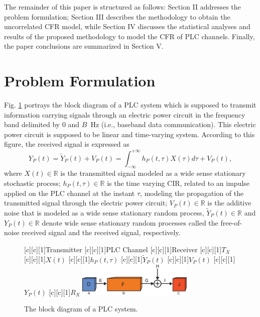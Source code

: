\documentclass[journal]{IEEEtran}
\begin{document}
The remainder of this paper is structured as follows: Section II addresses
the problem formulation; Section III describes the methodology to obtain the uncorrelated \ac{CFR} model, while Section IV discusses the statistical analyses and results of the proposed methodology to model the \ac{CFR} of \ac{PLC} channels. Finally, the paper conclusions are summarized in Section V.


\section{Problem Formulation}

Fig. \ref{PLCchannel} portrays the block diagram of a \ac{PLC} system which is supposed to transmit information carrying signals through an electric power circuit in the frequency band delimited by $0$ and $B$~Hz (i.e., baseband data communication). This electric power circuit is supposed to be linear and time-varying system. According to this figure, the received signal is expressed as
\begin{equation} \label{received signal}
Y_P(t) = \tilde{Y}_P(t)+V_P(t) = \int_{-\infty}^{+\infty} h_P(t,\tau) X(\tau) d\tau + V_P(t),
\end{equation}
where $X(t)\in \mathbb{R}$ is the transmitted signal modeled as a wide sense stationary stochastic process; $h_P(t,\tau)\in \mathbb{R}$ is the time varying \ac{CIR}, related to an impulse applied on the \ac{PLC} channel at the instant $\tau$, modeling the propagation of the transmitted signal through the electric power circuit; $V_P(t)\in \mathbb{R}$ is the additive noise that is modeled as a wide sense stationary random process, $\tilde{Y}_P(t)\in \mathbb{R}$ and $Y_P(t)\in \mathbb{R}$ denote wide sense stationary random processes called the free-of-noise received signal and the received signal, respectively.

\begin{figure}[h]
	\centering
	[c][1]{Transmitter}
	[c][1]{PLC Channel}
	[c][1]{Receiver}
	[c][1]{$T_X$}
	[c][1]{$X(t)$}
	[c][1]{$h_P(t,\tau)$}
	[c][1]{$\tilde{Y}_P(t)$}
	[c][1]{$V_P(t)$}
	[c][1]{$Y_P(t)$}
	[c][1]{$R_X$}
	\includegraphics[width=0.49\textwidth]{images/PLCchannel.eps}
	\caption{The block diagram of a PLC system.}
	\label{PLCchannel}
\end{figure}
\end{document}
